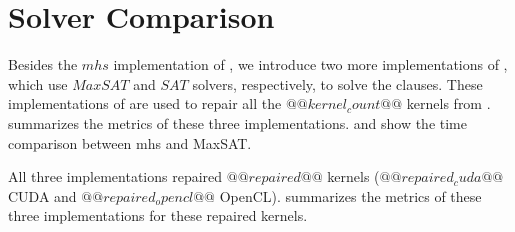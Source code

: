 \section{Solver Comparison}

Besides the $mhs$ implementation of \tool, we introduce two more implementations of \tool, which use $MaxSAT$ and $SAT$ solvers, respectively, to solve the clauses. These implementations of \tool are used to repair all the $@@kernel_count@@$ kernels from .  summarizes the metrics of these three implementations.  and  show the time comparison between mhs and MaxSAT.




All three implementations repaired $@@repaired@@$ kernels ($@@repaired_cuda@@$ CUDA and $@@repaired_opencl@@$ OpenCL).  summarizes the metrics of these three implementations for these repaired kernels.


